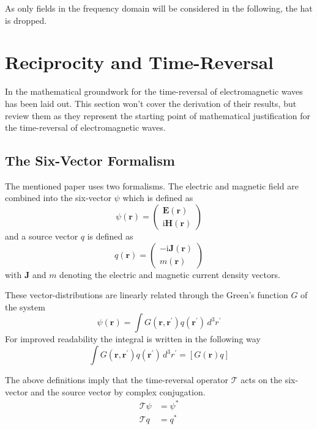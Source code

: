 As only fields in the frequency domain will be considered in the following, the hat is dropped.



\section{Reciprocity and Time-Reversal}\label{sec:math_foundations_em_tr}
In \parencite{de_rosny_theory_2010} the mathematical groundwork for the time-reversal of electromagnetic waves has been laid out.
This section won't cover the derivation of their results, but review them as they represent the starting point of mathematical justification for the time-reversal of electromagnetic waves.

\subsection{The Six-Vector Formalism}
The mentioned paper uses two formalisms.
The electric and magnetic field are combined into the  six-vector \(\psi \) which is defined as
\begin{equation}
    \psi(\bm{r}) = \begin{pmatrix}
        \bm{E}(\bm{r}) \\
        \mathrm{i} \bm{H}(\bm{r})
    \end{pmatrix}
\end{equation}
and a source vector \(q\) is defined as
\begin{equation}
    q(\bm{r}) = \begin{pmatrix}
        -\mathrm{i} \bm{J}(\bm{r}) \\
        m(\bm{r})
    \end{pmatrix}
\end{equation}
with \(\bm{J}\) and \(m\) denoting the electric and magnetic current density vectors.

These vector-distributions are linearly related through the Green's function \(G\) of the system
\begin{equation}
    \psi(\bm{r}) = \int G(\bm{r}, \bm{r}^{\prime}) q(\bm{r}^{\prime}) \, d^3 r^{\prime}
\end{equation}
For improved readability the integral is written in the following way
\begin{equation}
    \int G(\bm{r}, \bm{r}^{\prime}) q(\bm{r}^{\prime}) \, d^3 r^{\prime} = [G(\bm{r}) q]
\end{equation}

The above definitions imply that the time-reversal operator \(\mathcal{T}\) acts on the six-vector and the source vector by complex conjugation.
\begin{align}
    \mathcal{T}\psi &= \psi^* \\
    \mathcal{T}q &= q^*
\end{align}

